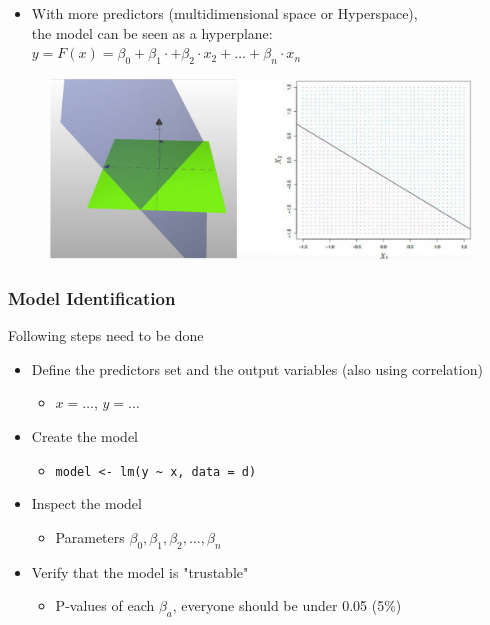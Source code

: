 \documentclass[a4paper]{article}
\begin{document}
			\begin{itemize}
				\item With more predictors (multidimensional space or Hyperspace), \\
					the model can be seen as a hyperplane: \\
					$ y = F(x) = \beta_0 + \beta_1\cdot + \beta_2 \cdot x_2 + \dots + \beta_n \cdot x_n $
			\end{itemize}
		
			\begin{figure}[htb!]
				\centering
				\includegraphics[width=.65\textwidth]{img/sw08/hyperplane.png}
			\end{figure}
		
			\newpage
			
			\subsubsection{Model Identification}
			
			Following steps need to be done
				\begin{itemize}
					\item Define the predictors set and the output variables (also using correlation)
						\begin{itemize}
							\item $x = \dots$, $y = \dots$
						\end{itemize}
					\item Create the model
						\begin{itemize}
							\item \texttt{model <- lm(y \textasciitilde{} x, data = d)}
						\end{itemize}
					\item Inspect the model
						\begin{itemize}
							\item Parameters $\beta_0, \beta_1, \beta_2, \dots, \beta_n$
						\end{itemize}
					\item Verify that the model is "trustable"
						\begin{itemize}
							\item P-values of each $\beta_a$, everyone should be under 0.05 (5\%)
						\end{itemize}
				\end{itemize}
			
\end{document}
